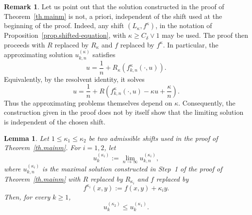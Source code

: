 \documentclass[11pt,a4paper,reqno]{amsart}
\newtheorem{lemma}[theorem]{\bf Lemma}
\theoremstyle{definition}
\newtheorem{remark}[theorem]{Remark}
\numberwithin{equation}{section}
\begin{document}
\begin{remark}
\label{rem.ind1}
Let us point out that the solution constructed in the proof of
Theorem~\ref{th.mainm} is not, a priori, independent of the shift used
at the beginning of the proof. Indeed, any shift
$(L_\kappa,f^\kappa)$, in the notation of
Proposition~\ref{prop.shifted-equation}, with $\kappa\ge C_\delta\vee1$
may be used. The proof then proceeds with $R$ replaced by $R_\kappa$
and $f$ replaced by $f^\kappa$. In particular, the approximating
solution $u_{k,n}^{(\kappa)}$ satisfies
\begin{equation}
\label{eq.pkndep}
u
=
\frac1n+
R_\kappa\left(
f^\kappa_{k,n}(\cdot,u)
\right).
\end{equation}
Equivalently, by the resolvent identity, it solves 
\[
u=\frac1n+R\left(f^\kappa_{k,n}(\cdot,u)-\kappa u+\frac{\kappa}{n}\right).
\]
Thus the approximating problems themselves depend on $\kappa$.
Consequently, the construction given in the proof does not by itself
show that the limiting solution is independent of the chosen shift.
\end{remark}




\begin{lemma}
\label{lm.shiftmon}
Let $1\le \kappa_1\le \kappa_2$ be two admissible shifts used in the proof of
Theorem~\ref{th.mainm}. For $i=1,2$, let
\[
u_k^{(\kappa_i)}
:=
\lim_{n\to\infty}u_{k,n}^{(\kappa_i)},
\]
where $u_{k,n}^{(\kappa_i)}$ is the maximal solution constructed in
Step~1 of the proof of Theorem~\ref{th.mainm} with $R$ replaced by
$R_{\kappa_i}$ and $f$ replaced by
\[
f^{\kappa_i}(x,y):=f(x,y)+\kappa_i y.
\]
Then, for every $k\ge1$,
\[
u_k^{(\kappa_2)}\le u_k^{(\kappa_1)}.
\]
\end{lemma}
\end{document}
